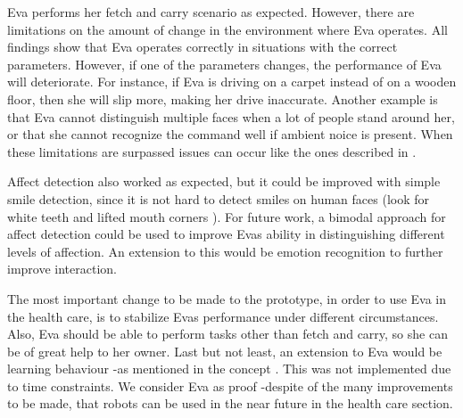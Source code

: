 \documentclass[project_eva.tex]{subfiles}
\begin{document}
Eva performs her fetch and carry scenario as expected. However, there are limitations on the amount of change in the 
environment where Eva operates. All findings show that Eva operates correctly in situations with the correct 
parameters. However, if one of the parameters changes, the performance of Eva will deteriorate. For instance, if Eva is 
driving on a carpet instead of on a wooden floor, then she will slip more, making her drive inaccurate. Another example 
is that Eva cannot distinguish multiple faces when a lot of people stand around her, or that she cannot recognize the 
command well if ambient noice is present. When these limitations are surpassed issues can occur like the ones described 
in \pageref{simulation} .

Affect detection also worked as expected, but it could be improved with simple smile detection, since it is not hard to 
detect smiles on human faces (look for white teeth and lifted mouth corners \cite{autosmiley} \cite{smile} ). For future work, a bimodal approach \cite{bimodal} for affect detection could be used to improve Eva\textquotesingle s ability in 
distinguishing different levels of affection. An extension to this would be emotion recognition to further improve 
interaction.

The most important change to be made to the prototype, in order to use Eva in the health care, is to stabilize 
Eva\textquotesingle s performance under different circumstances. Also, Eva should be able to perform tasks other 
than fetch and carry, so she can be of great help to her owner. Last but not least, an extension to Eva would be learning behaviour -as mentioned in the concept \pageref{concept} . This was not implemented due to time constraints. We consider Eva as proof -despite of the many improvements to be made, that robots can be used in the near future in the health care section.
\end{document}
